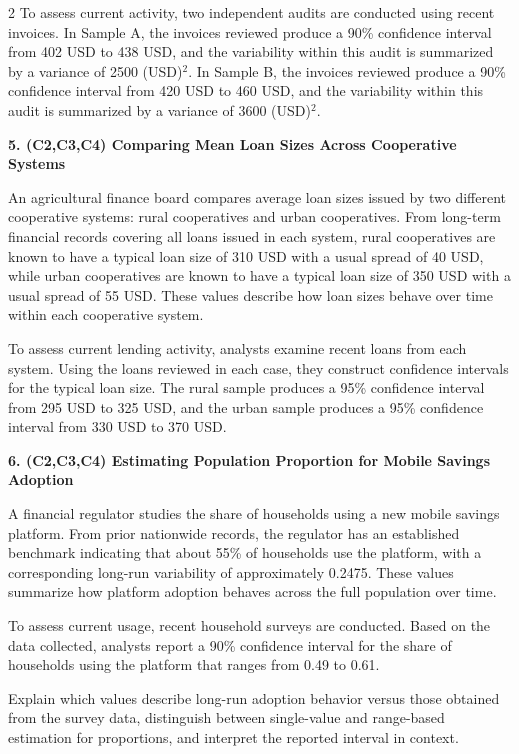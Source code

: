 \documentclass[12pt]{article}
\newcommand{\SubsectionBox}[1]{%
	\noindent\colorbox{gray!30}{%
		\parbox{\linewidth}{\textbf{#1}}%
	}\par\vspace{0.35cm}%
}
\begin{document}
\begin{multicols}{2}
		To assess current activity, two independent audits are conducted using recent invoices. In Sample A, the invoices reviewed produce a 90\% confidence interval from 402 USD to 438 USD, and the variability within this audit is summarized by a variance of 2500 (USD)$^2$. In Sample B, the invoices reviewed produce a 90\% confidence interval from 420 USD to 460 USD, and the variability within this audit is summarized by a variance of 3600 (USD)$^2$.

		\vspace{0.25cm}
		\SubsectionBox{5. (C2,C3,C4) Comparing Mean Loan Sizes Across Cooperative Systems}\vspace{-0.25cm}
		An agricultural finance board compares average loan sizes issued by two different cooperative systems: rural cooperatives and urban cooperatives. From long-term financial records covering all loans issued in each system, rural cooperatives are known to have a typical loan size of 310 USD with a usual spread of 40 USD, while urban cooperatives are known to have a typical loan size of 350 USD with a usual spread of 55 USD. These values describe how loan sizes behave over time within each cooperative system.

		To assess current lending activity, analysts examine recent loans from each system. Using the loans reviewed in each case, they construct confidence intervals for the typical loan size. The rural sample produces a 95\% confidence interval from 295 USD to 325 USD, and the urban sample produces a 95\% confidence interval from 330 USD to 370 USD.

		\vspace{0.25cm}
		\SubsectionBox{6. (C2,C3,C4) Estimating Population Proportion for Mobile Savings Adoption}\vspace{-0.25cm}
		A financial regulator studies the share of households using a new mobile savings platform. From prior nationwide records, the regulator has an established benchmark indicating that about 55\% of households use the platform, with a corresponding long-run variability of approximately 0.2475. These values summarize how platform adoption behaves across the full population over time.

		To assess current usage, recent household surveys are conducted. Based on the data collected, analysts report a 90\% confidence interval for the share of households using the platform that ranges from 0.49 to 0.61.

		Explain which values describe long-run adoption behavior versus those obtained from the survey data, distinguish between single-value and range-based estimation for proportions, and interpret the reported interval in context.
	\end{multicols}
\end{document}
